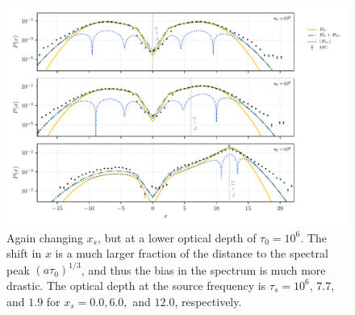 \documentclass{aastex63}
\begin{document}
 \begin{figure}
    \centering
    \includegraphics{xinit_threepanel_tau1e6.pdf}
    \caption{Again changing $x_s$, but at a lower optical depth of $\tau_0 = 10^6$. The shift in $x$ is a much larger fraction of the distance to the spectral peak $(a\tau_0)^{1/3}$, and thus the bias in the spectrum is much more drastic. The optical depth at the source frequency is $\tau_s = 10^6$, $7.7$, and $1.9$ for $x_s=0.0, 6.0,$ and $12.0$, respectively. } 
    \label{fig:sol_mc_xinit_lowtau}
\end{figure}
\end{document}
